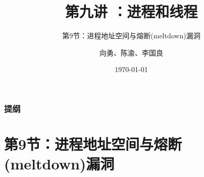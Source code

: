 



\title[第9讲]{第九讲 ：进程和线程} %
\subtitle{第9节：进程地址空间与熔断(meltdown)漏洞}
\author{向勇、陈渝、李国良} %
\date{\today} %




\begin{frame}
\titlepage %
\end{frame}

\begin{frame}
\frametitle{提纲} %
\tableofcontents %
\end{frame}
\section{第9节：进程地址空间与熔断(meltdown)漏洞}%
